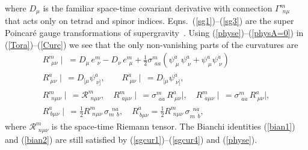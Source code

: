 \documentclass[a4paper,12pt]{article}
\newcommand{\Ga}{\ensuremath{\Gamma}}
\newcommand{\si}{\ensuremath{\sigma}}
\newcommand{\sfrac}[2]{\ensuremath{{\scriptstyle \frac{#1}{#2}}}}
\begin{document}
where $D_\mu$ is the familiar space-time covariant derivative with connection $\Ga^m_{\ \,n\mu}$ that acts only on tetrad and spinor indices. Eqns.\ (\ref{sg1})--(\ref{sg3}) are the super Poincar\'{e} gauge transformations of supergravity~\cite{cha,sal}. Using (\ref{physe})--(\ref{physA=0}) in  (\ref{Tora})--(\ref{Curc}) we see that the only non-vanishing parts of the curvatures are
\begin{gather}
R^m_{\ \,\mu\nu}\!\!\mid\;=D_\mu\,e^m_{\ \,\nu}-D_\nu\,e^m_{\ \,\mu}+\sfrac{1}{2}\si^m_{\ \,a\dot{a}}(\psi^{\dot{a}}_{\ \mu}\,\psi^a_{\ \nu}+\psi^a_{\ \mu}\psi^{\dot{a}}_{\ \nu})  \label{sgcur1} \\
R^a_{\ \mu\nu}\!\!\mid\,=D_{[\mu}\psi^a_{\ \nu]}, \qquad R^{\dot{a}}_{\ \mu\nu}\!\!\mid\,=D_{[\mu}\psi^{\dot{a}}_{\ \nu]}, \label{sgcur2} \\
R^m_{\ \,n\mu\nu}\!\!\mid\,=\mathcal{R}^m_{\ \,n\mu\nu}, \quad R^m_{\ \,a\mu\nu}\!\!\mid\,=\si^m_{\ \,a\dot{a}}\,R^{\dot{a}}_{\ \mu\nu}\!\!\mid, \quad R^m_{\ \,\dot{a}\mu\nu}\!\!\mid\,=\si^m_{\ \,a\dot{a}}\,R^a_{\ \mu\nu}\!\!\mid, \label{sgcur3} \\
R^a_{\ b\mu\nu}\!\!\mid\,=\frac{1}{2}R^m_{\ \,n\mu\nu}\,\si_{m\ \ b}^{\ \;na},  \quad R^{\dot{a}}_{\ \dot{b}\mu\nu}=\frac{1}{2}R^m_{\ \,n\mu\nu}\,\si_{m\ \ \dot{b}}^{\ \;n\dot{a}},  \label{sgcur4}
\end{gather}
where $\mathcal{R}^m_{\ \,n\mu\nu}$ is the space-time Riemann tensor. The Bianchi identities (\ref{bian1}) and (\ref{bian2}) are still satisfied by (\ref{sgcur1})--(\ref{sgcur4}) and (\ref{physe}).
\end{document}
